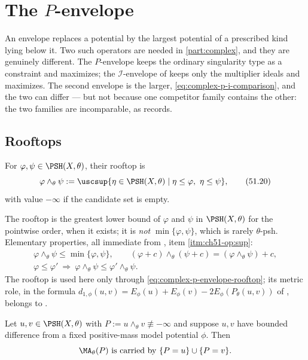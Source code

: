 \section{The \texorpdfstring{\(P\)}{P}-envelope}
\label{sec:ch51-p-envelope}

An envelope replaces a potential by the largest potential of a prescribed
kind lying below it.  Two such operators are needed in
\cref{part:complex}, and they are genuinely different.  The
\(P\)-envelope keeps the ordinary singularity type as a constraint and
maximizes; the \(\mathcal I\)-envelope of 
keeps only the multiplier ideals and maximizes.  The second envelope is the
larger, \eqref{eq:complex-p-i-comparison}, and the two can differ --- but
not because one competitor family contains the other: the two families are
incomparable, as  records.

\subsection{Rooftops}
\label{sec:ch51-rooftop}

For \(\varphi,\psi\in\PSH(X,\theta)\), their rooftop is
\[
 \varphi\wedge_\theta\psi
 :=\uscsup\{\eta\in\PSH(X,\theta)\mid
             \eta\leq\varphi,\ \eta\leq\psi\},
\tag{51.20}\label{eq:complex-rooftop}
\]
with value \(-\infty\) if the candidate set is empty.

The rooftop is the greatest lower bound of \(\varphi\) and \(\psi\) in
\(\PSH(X,\theta)\) for the pointwise order, when it exists; it is
\emph{not} \(\min\{\varphi,\psi\}\), which is rarely \(\theta\)-psh.
Elementary properties, all immediate from
, item \cref{itm:ch51-op:sup}:
\[
 \begin{gathered}
 \varphi\wedge_\theta\psi\leq\min\{\varphi,\psi\},
 \qquad
 (\varphi+c)\wedge_\theta(\psi+c)=(\varphi\wedge_\theta\psi)+c,\\
 \varphi\leq\varphi'\ \Longrightarrow\
 \varphi\wedge_\theta\psi\leq\varphi'\wedge_\theta\psi .
 \end{gathered}
\]
The rooftop is used here only through
\eqref{eq:complex-p-envelope-rooftop}; its metric role, in the formula
\(d_{1,\phi}(u,v)=E_\phi(u)+E_\phi(v)-2E_\phi(P_\theta(u,v))\) of
\Cref{def:appH-i-d1}, belongs to \Cref{chap:rays-test-curves}.

\begin{lemma}\label{lem:ch51-rooftop-contact}
Let \(u,v\in\PSH(X,\theta)\) with \(P:=u\wedge_\theta v\not\equiv-\infty\)
and suppose \(u,v\) have bounded difference from a fixed positive-mass
model potential \(\phi\).  Then
\[
 \MA_\theta(P)\ \text{is carried by}\ \{P=u\}\cup\{P=v\}.
\]
\end{lemma}

